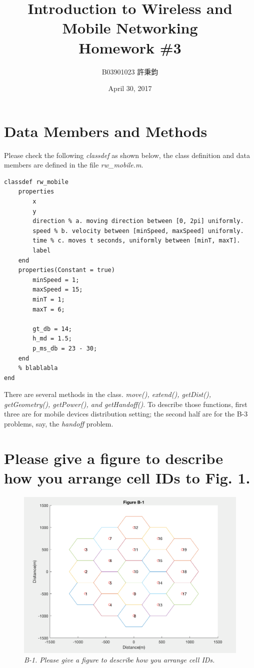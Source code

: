 \documentclass{article}
\title{Introduction to Wireless and Mobile Networking\\ Homework \#3}
\author{B03901023 許秉鈞}
\date{April 30, 2017} %
\begin{document}
\maketitle
\section{Data Members and Methods}
Please check the following \emph{classdef} as shown below, the class definition and data members are defined in the file \emph{rw\_mobile.m}.
\begin{lstlisting}[caption = {rw\_mobile.m}]
classdef rw_mobile
    properties
        x
        y
        direction % a. moving direction between [0, 2pi] uniformly.
        speed % b. velocity between [minSpeed, maxSpeed] uniformly.
        time % c. moves t seconds, uniformly between [minT, maxT].
        label
    end
    properties(Constant = true)
        minSpeed = 1;
        maxSpeed = 15;
        minT = 1;
        maxT = 6;

        gt_db = 14;
        h_md = 1.5;
        p_ms_db = 23 - 30;
    end
    % blablabla
end
\end{lstlisting}
There are several methods in the class. \emph{move(), extend(), getDist(), getGeometry(), getPower(), and getHandoff()}. To describe those functions, first three are for mobile devices distribution setting; the second half are for the B-3 problems, say, the \emph{handoff} problem.

\section{Please give a figure to describe how you arrange cell IDs to Fig. 1.}
\begin{figure}[h]
    \centering
    \includegraphics[width=1\textwidth]{fig1}
    \caption{\emph{B-1. Please give a figure to describe how you arrange cell IDs.}}
    \label{fig:mesh1}
\end{figure}
\end{document}
